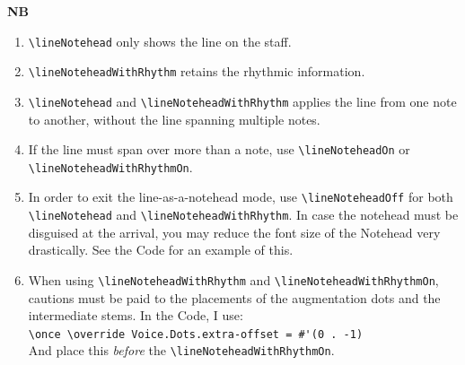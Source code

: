 \textbf{NB} 
\begin{enumerate} 
\item \verb|\lineNotehead| only shows the line on the staff.
\item \verb|\lineNoteheadWithRhythm| retains the rhythmic information. 
\item \verb|\lineNotehead| and \verb|\lineNoteheadWithRhythm| applies the line from one note to another, without the line spanning multiple notes.
\item If the line must span over more than a note, use \verb|\lineNoteheadOn| or \\ \verb|\lineNoteheadWithRhythmOn|. 
\item In order to exit the line-as-a-notehead mode, use \verb|\lineNoteheadOff| for both \\ \verb|\lineNotehead| and \verb|\lineNoteheadWithRhythm|. In case the notehead must be disguised at the arrival, you may reduce the font size of the Notehead very drastically. See the Code for an example of this. 
\item When using \verb|\lineNoteheadWithRhythm| and \verb|\lineNoteheadWithRhythmOn|, cautions must be paid to the placements of the augmentation dots and the intermediate stems. In the Code, I use: \\ 
\verb|\once \override Voice.Dots.extra-offset = #'(0 . -1)| \\
And place this \textit{before} the \verb|\lineNoteheadWithRhythmOn|.
\end{enumerate}

